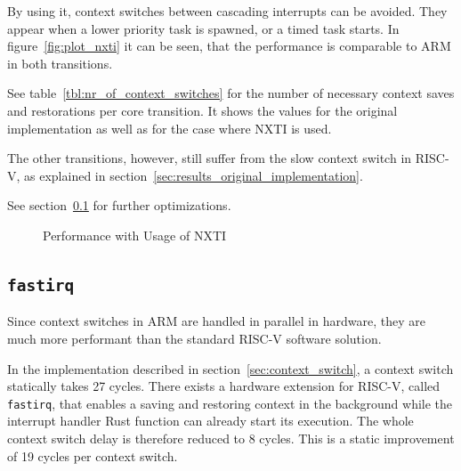 By using it, context switches between cascading interrupts can be avoided. They appear when a lower priority task is spawned, or a timed task starts. In figure~\ref{fig:plot_nxti} it can be seen, that the performance is comparable to ARM in both transitions.

See table~\ref{tbl:nr_of_context_switches} for the number of necessary context saves and restorations per core transition. It shows the values for the original implementation as well as for the case where NXTI is used.

The other transitions, however, still suffer from the slow context switch in RISC-V, as explained in section~\ref{sec:results_original_implementation}.

See section~\ref{sec:results_fastirq} for further optimizations.

\begin{figure}
\caption{Performance with Usage of NXTI}
\end{figure}

\subsection{\texttt{fastirq}}
\label{sec:results_fastirq}

Since context switches in ARM are handled in parallel in hardware, they are much more performant than the standard RISC-V software solution.

In the implementation described in section~\ref{sec:context_switch}, a context switch statically takes 27 cycles. There exists a hardware extension for RISC-V, called \texttt{fastirq}, that enables a saving and restoring context in the background while the interrupt handler Rust function can already start its execution. The whole context switch delay is therefore reduced to 8 cycles. This is a static improvement of 19 cycles per context switch.


